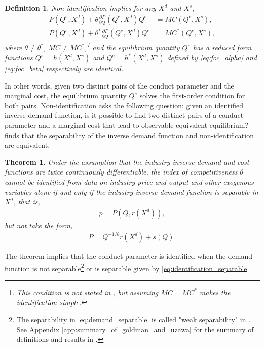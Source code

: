 \documentclass[11pt, a4paper]{article}
\newtheorem{theorem}{Theorem}
\newtheorem{definition}{Definition}
\theoremstyle{remark}
\begin{document}
\begin{definition}\label{def:non_identification}
Non-identification implies for any $X^{d}$ and $X^{s}$,
\begin{align}
P(Q^e, X^{d}) + \theta \frac{\partial P}{\partial Q}(Q^e, X^{d})Q^e &= MC(Q^e, X^{s}),  \label{eq:foc_alpha}\\
P(Q^e, X^{d}) + \theta^{*} \frac{\partial P}{\partial Q}(Q^e, X^{d})Q^e &= MC^{*}(Q^e, X^{s}),\label{eq:foc_beta}
\end{align}
where $\theta \neq \theta^{*}$, $MC \ne MC^{*}$,\footnote{This condition is not stated in \citet{lau1982identifying}, but assuming $MC = MC^{*}$ makes the identification simple.} and the equilibrium quantity $Q^e$ has a reduced form functions $Q^e = h(X^{d}, X^{s})$ and $Q^e = h^{*}(X^{d}, X^{s})$ defined by \eqref{eq:foc_alpha} and \eqref{eq:foc_beta} respectively are identical.
\end{definition}

In other words, given two distinct pairs of the conduct parameter and the marginal cost, the equilibrium quantity $Q^e$ solves the first-order condition for both pairs.
Non-identification asks the following question: given an identified inverse demand function, is it possible to find two distinct pairs of a conduct parameter and a marginal cost that lead to observable equivalent equilibrium?
\citet{lau1982identifying} finds that the separability of the inverse demand function and non-identification are equivalent.

\begin{theorem}\label{theorem_lau}
    Under the assumption that the industry inverse demand and cost functions are twice continuously differentiable, the index of competitiveness $\theta$ cannot be identified from data on industry price and output and other exogenous variables alone if and only if the industry inverse demand function is separable in $X^{d}$, that is,
    \begin{align}
        p = P(Q, r(X^{d})), \label{eq:demand_separable}
    \end{align}
    but not take the form, 
    \begin{align}
        P = Q^{-1/\theta}r(X^{d}) + s(Q). \label{eq:identification_separable}
    \end{align}
\end{theorem}
The theorem implies that the conduct parameter is identified when the demand function is not separable\footnote{The separability in \eqref{eq:demand_separable} is called "weak separability" in \citet{goldmanNote1964}. See Appendix \ref{app:summary_of_goldman_and_uzawa} for the summary of definitions and results in \citet{goldmanNote1964}.} or is separable given by \eqref{eq:identification_separable}.
\end{document}

